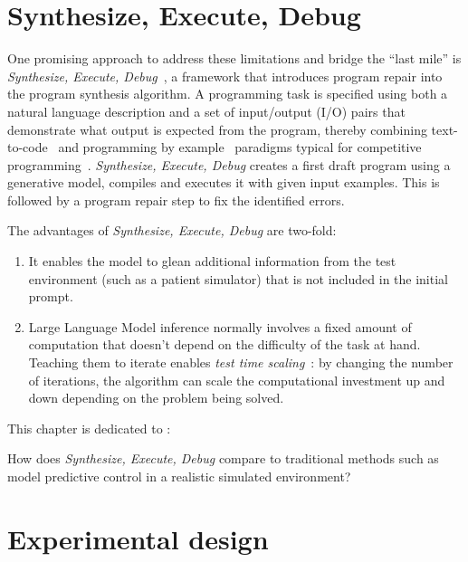 \newpage
\section{Synthesize, Execute, Debug}
One promising approach to address these limitations and bridge the ``last mile'' is \emph{Synthesize, Execute, Debug}~\cite{guptaSynthesizeExecuteDebug2020}, a framework that introduces program repair into the program synthesis algorithm. 
A programming task is specified using both a natural language description and a set of input/output (I/O) pairs that demonstrate what output is expected from the program, thereby combining text-to-code~\cite{iyer2018:mapping} and programming by example~\cite{halbertProgrammingExample1984,gulwani2016:programming} paradigms typical for competitive programming~\cite{zavershynskyi2018:naps}.
\emph{Synthesize, Execute, Debug} creates a first draft program using a generative model, compiles and executes it with given input examples.
This is followed by a program repair step to fix the identified errors.

The advantages of \emph{Synthesize, Execute, Debug} are two-fold:

\begin{enumerate}
  \item It enables the model to glean additional information from the test environment (such as a patient simulator) that is not included in the initial prompt.
  \item Large Language Model inference normally involves a fixed amount of computation that doesn't depend on the difficulty of the task at hand. Teaching them to iterate enables \emph{test time scaling}~\cite{zhangWhatHowWhere2025}: by changing the number of iterations, the algorithm can scale the computational investment up and down depending on the problem being solved.
\end{enumerate}

This chapter is dedicated to \rqboptest:

\begin{highlight}
  How does \emph{Synthesize, Execute, Debug} compare to traditional methods such as model predictive control in a realistic simulated environment?
\end{highlight}

\newpage
\section{Experimental design}
\label{sec:BOPTEST}

